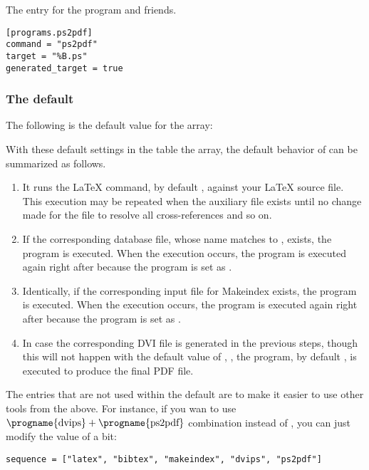 \documentclass[draft]{llmk-doc}
\begin{document}
 The entry for the  program and friends.
%
\begin{lstlisting}[style=toml]
[programs.ps2pdf]
command = "ps2pdf"
target = "%B.ps"
generated_target = true
\end{lstlisting}

\subsubsection{The default }
\label{sec:default-sequence}

The following is the default value for the  array:
%
\begin{htcode}
\end{htcode}

With these default settings in the  table the 
array, the default behavior of  can be summarized as follows.
%
\begin{enumerate}
\item It runs the {\LaTeX} command, by default {\LuaLaTeX}, against your
  {\LaTeX} source file. This execution may be repeated when the auxiliary file
  exists until no change made for the file to resolve all cross-references and
  so on.
\item If the corresponding {\BibTeX} database file, whose name matches to
  , exists, the {\BibTeX} program is executed. When the execution
  occurs, the  program is executed again right after because
  the program is set as .
\item Identically, if the corresponding input file for Makeindex exists, the
  program is executed. When the execution occurs, the  program
  is executed again right after because the program is set as .
\item In case the corresponding DVI file is generated in the previous steps,
  though this will not happen with the default value of , \ie
  , the  program, by default ,
  is executed to produce the final PDF file.
\end{enumerate}

The entries that are not used within the default  are to make it
easier to use other tools from the above. For instance, if you wan to use
$\text{\progname{dvips}}+\text{\progname{ps2pdf}}$ combination instead of
, you can just modify the value of  a bit:
%
\begin{lstlisting}[style=toml]
sequence = ["latex", "bibtex", "makeindex", "dvips", "ps2pdf"]
\end{lstlisting}
\end{document}
